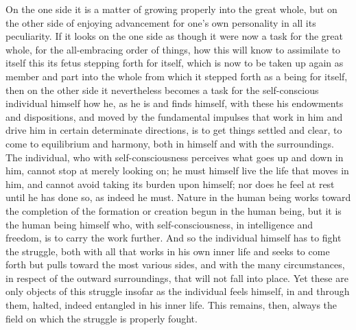 \documentclass[12pt,a4paper,openany]{book}
\begin{document}
On the one side it is a matter of growing properly into the great whole, but on the
other side of enjoying advancement for one's own personality in all its peculiarity.
If it looks on the one side as though it were now a task for the great whole, for
the all-embracing order of things, how this will know to assimilate to itself this
its fetus stepping forth for itself, which is now to be taken up again as member and
part into the whole from which it stepped forth as a being for itself, then on the
other side it nevertheless becomes a task for the self-conscious individual himself
how he, as he is and finds himself, with these his endowments and dispositions, and
moved by the fundamental impulses that work in him and drive him in certain
determinate directions, is to get things settled and clear, to come to equilibrium
and harmony, both in himself and with the surroundings. The individual, who with
self-consciousness perceives what goes up and down in him, cannot stop at merely
looking on; he must himself live the life that moves in him, and cannot avoid
taking its burden upon himself; nor does he feel at rest until he has done so, as
indeed he must. Nature in the human being works toward the completion of the
formation or creation begun in the human being, but it is the human being himself
who, with self-consciousness, in intelligence and freedom, is to carry the work
further. And so the individual himself has to fight the struggle, both with all that
works in his own inner life and seeks to come forth but pulls toward the most
various sides, and with the many circumstances, in respect of the outward
surroundings, that will not fall into place. Yet these are only objects of this
struggle insofar as the individual feels himself, in and through them, halted,
indeed entangled in his inner life. This remains, then, always the field on which
the struggle is properly fought.
\end{document}
